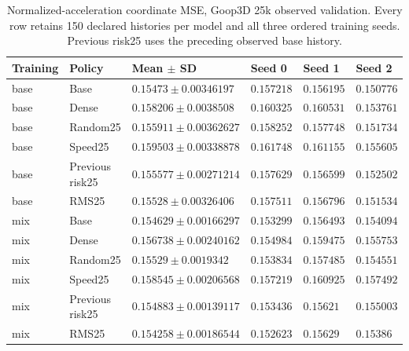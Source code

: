 \begin{table}[p]
\centering\scriptsize
\caption{Normalized-acceleration coordinate MSE, Goop3D 25k observed validation. Every row retains 150 declared histories per model and all three ordered training seeds. Previous risk25 uses the preceding observed base history.}
\label{tab:goop3d25k-observed-normalized-validation}
\setlength{\tabcolsep}{3pt}
\begin{tabular}{llllll}
\toprule
Training & Policy & Mean $\pm$ SD & Seed 0 & Seed 1 & Seed 2\\
\midrule
base & Base & $0.15473\pm0.00346197$ & $0.157218$ & $0.156195$ & $0.150776$\\
base & Dense & $0.158206\pm0.0038508$ & $0.160325$ & $0.160531$ & $0.153761$\\
base & Random25 & $0.155911\pm0.00362627$ & $0.158252$ & $0.157748$ & $0.151734$\\
base & Speed25 & $0.159503\pm0.00338878$ & $0.161748$ & $0.161155$ & $0.155605$\\
base & Previous risk25 & $0.155577\pm0.00271214$ & $0.157629$ & $0.156599$ & $0.152502$\\
base & RMS25 & $0.15528\pm0.00326406$ & $0.157511$ & $0.156796$ & $0.151534$\\
mix & Base & $0.154629\pm0.00166297$ & $0.153299$ & $0.156493$ & $0.154094$\\
mix & Dense & $0.156738\pm0.00240162$ & $0.154984$ & $0.159475$ & $0.155753$\\
mix & Random25 & $0.15529\pm0.0019342$ & $0.153834$ & $0.157485$ & $0.154551$\\
mix & Speed25 & $0.158545\pm0.00206568$ & $0.157219$ & $0.160925$ & $0.157492$\\
mix & Previous risk25 & $0.154883\pm0.00139117$ & $0.153436$ & $0.15621$ & $0.155003$\\
mix & RMS25 & $0.154258\pm0.00186544$ & $0.152623$ & $0.15629$ & $0.15386$\\
\bottomrule
\end{tabular}
\end{table}

